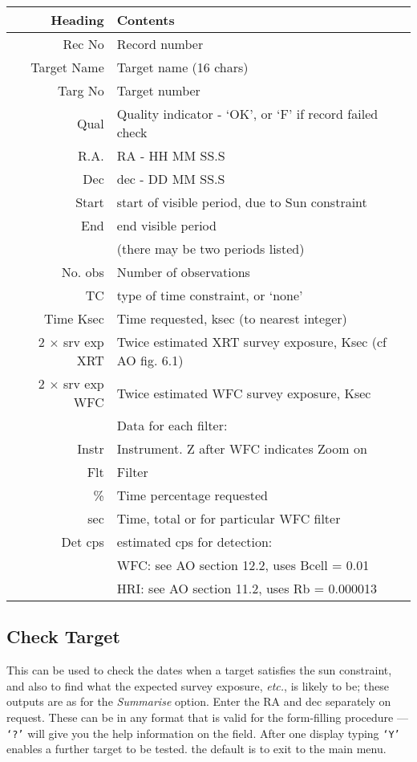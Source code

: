 \begin{center}
\begin{tabular}{rl}
\setlength{\leftmargin}{40mm}
\hspace{20mm}Heading	& Contents\\ \hline
Rec No		& Record number\\
Target Name	& Target name (16 chars)\\
Targ No		& Target number\\
Qual		& Quality indicator - `OK', or `F' if record failed check\\
R.A.		& RA - HH MM SS.S\\
Dec		& dec - DD MM SS.S\\
Start		& start of visible period, due to Sun constraint\\
End		& end visible period\\
		& (there may be two periods listed)\\
No. obs		& Number of observations\\
TC		& type of time constraint, or `none'\\
Time Ksec	& Time requested, ksec (to nearest integer)\\
2 $\times$ srv exp XRT	& Twice estimated XRT survey exposure, Ksec (cf AO fig. 6.1)\\
2 $\times$ srv exp WFC	& Twice estimated WFC survey exposure, Ksec \\
		& Data for each filter:\\
Instr		& Instrument. Z after WFC indicates Zoom on\\
Flt		& Filter\\
\%		& Time percentage requested\\
sec		& Time, total or for particular WFC filter \\
Det cps		& estimated cps for detection:\\
		& WFC:  see AO section 12.2, uses Bcell = 0.01\\
		& HRI:  see AO section 11.2, uses Rb = 0.000013\\
\end{tabular}
\end{center}

\subsection{Check Target}

This can be used to check the dates when a target satisfies the sun
constraint, and also to find what the expected survey exposure,
{\em etc.}, is likely to be; these outputs are as for the {\em Summarise}
option.  Enter the RA and dec separately on request.  These can be in
any format that is valid for the form-filling procedure --- {\tt `?'} will
give you the help information on the field. After one display typing
{\tt `Y'} enables a further target to be tested. the default is to exit to
the main menu.

